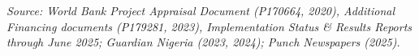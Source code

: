 \documentclass[11pt,landscape,letterpaper]{article}
\begin{document}
\vfill

\begin{center}
\begin{minipage}{0.85\textwidth}
  \color{navy}\fontsize{10.5}{15}\selectfont\itshape
  Source: World Bank Project Appraisal Document (P170664, 2020), Additional Financing
  documents (P179281, 2023), Implementation Status \& Results Reports through June 2025;
  Guardian Nigeria (2023, 2024); Punch Newspapers (2025).
\end{minipage}
\end{center}

\newpage
\thispagestyle{fancy}

\vspace*{0.1cm}
\end{document}
